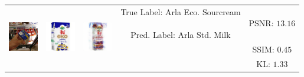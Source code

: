 \begin{tabular}{c c c c c}
	\midrule
	\multirow{3}{*}{\includegraphics[width=13mm, height=13mm]{PaperB/figures_and_tables/decoded_iconic_images/Arla-Ecological-Sour-Cream_005.jpg}} & \multirow{3}{*}{\includegraphics[width=13mm, height=13mm]{PaperB/figures_and_tables/iconic_image_figures/Arla-Ecological-Sour-Cream_Iconic.jpg}} & \multirow{3}{*}{\includegraphics[width=13mm, height=13mm]{PaperB/figures_and_tables/decoded_iconic_images/vcca_xiwy_NEW/arla_eco_sourcream_image1565.png}} & \multirowcell{3}{True Label: Arla Eco. Sourcream\\ \\ Pred. Label: Arla Std. Milk} & PSNR: $13.16$ \\
	& & & & SSIM: $0.45$ \\
	& & & & KL: $1.33$ \\
	\bottomrule 
\end{tabular}
